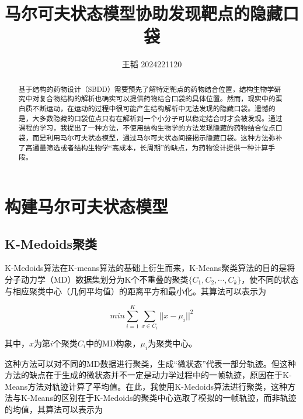 \documentclass[a4paper]{article}
\title{马尔可夫状态模型协助发现靶点的隐藏口袋}                   %
\author{王韬 2024221120}
\begin{document}
	
\begin{CJK}{UTF8}{gbsn}
\maketitle

\begin{center}
\tableofcontents
\end{center}

 \begin{abstract}

基于结构的药物设计（SBDD）需要预先了解特定靶点的药物结合位置，结构生物学研究中对复合物结构的解析也确实可以提供药物结合口袋的具体位置。然而，现实中的蛋白质不断运动，在运动的过程中很可能产生结构解析中无法发现的隐藏口袋。遗憾的是，大多数隐藏的口袋位点只有在解析到一个小分子可以稳定结合时才会被发现。通过课程的学习，我提出了一种方法，不使用结构生物学的方法发现隐藏的药物结合位点口袋，而是利用马尔可夫状态模型，通过马尔可夫状态间接揭示隐藏口袋。这种方法弥补了高通量筛选或者结构生物学“高成本，长周期”的缺点，为药物设计提供一种计算手段。

 \end{abstract}
\newpage


\section{构建马尔可夫状态模型}
	\subsection{K-Medoids聚类}

K-Medoids算法在K-means算法的基础上衍生而来，K-Means聚类算法的目的是将分子动力学（MD）数据集划分为K个不重叠的聚类$\{C_{1},C_{2}, \cdots,  C_{k}\}$，使不同的状态与相应聚类中心（几何平均值）的距离平方和最小化。其算法可以表示为

\begin{equation}
min\sum_{i=1}^{K}\sum_{x\in C_{i}}^{} {\vert\vert x- \mu_{i} \vert\vert}^{2}
\end{equation}

其中，$x$为第$i$个聚类$C_{i}$中的MD构象，$\mu_{i}$为聚类中心。


这种方法可以对不同的MD数据进行聚类，生成“微状态”代表一部分轨迹。但这种方法的缺点在于生成的微状态并不一定是动力学过程中的一帧轨迹，原因在于K-Means方法对轨迹计算了平均值。在此，我使用K-Medoids算法进行聚类，这种方法与K-Means的区别在于K-Medoids的聚类中心选取了模拟的一帧轨迹，而非轨迹的均值，其算法可以表示为


\end{CJK}
\end{document}
